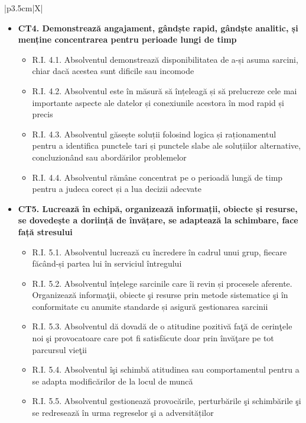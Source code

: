 \documentclass[11pt,a4paper]{article}
\begin{document}
\begin{xltabular}{\textwidth}{|p{3.5cm}|X|}
\begin{itemize}[leftmargin=*]
\begin{itemize}
        \end{itemize}
    \item \textbf{CT4. Demonstrează angajament, gândște rapid, gândște analitic, și menține concentrarea pentru perioade lungi de timp}
    \begin{itemize}
            \item R.I. 4.1. Absolventul demonstrează disponibilitatea de a-și asuma sarcini, chiar dacă acestea sunt dificile sau incomode
            \item R.I. 4.2. Absolventul este în măsură să înțeleagă și să prelucreze cele mai importante aspecte ale datelor și conexiunile acestora în mod rapid și precis
            \item R.I. 4.3. Absolventul găsește soluții folosind logica și raționamentul pentru a identifica punctele tari și punctele slabe ale soluțiilor alternative, concluzionând sau abordărilor problemelor
            \item R.I. 4.4. Absolventul rămâne concentrat pe o perioadă lungă de timp pentru a judeca corect și a lua decizii adecvate
        \end{itemize}
    \item \textbf{CT5. Lucrează în echipă, organizează informații, obiecte și resurse, se dovedește a doriință de învățare, se adaptează la schimbare, face față stresului}
    \begin{itemize}
            \item R.I. 5.1. Absolventul lucrează cu încredere în cadrul unui grup, fiecare făcând-și partea lui în serviciul întregului
            \item R.I. 5.2. Absolventul înțelege sarcinile care îi revin și procesele aferente. Organizează informaţii, obiecte şi resurse prin metode sistematice şi în conformitate cu anumite standarde și asigură gestionarea sarcinii
            \item R.I. 5.3. Absolventul dă dovadă de o atitudine pozitivă faţă de cerinţele noi şi provocatoare care pot fi satisfăcute doar prin învăţare pe tot parcursul vieţii
            \item R.I. 5.4. Absolventul îşi schimbă atitudinea sau comportamentul pentru a se adapta modificărilor de la locul de muncă
            \item R.I. 5.5. Absolventul gestionează provocările, perturbările şi schimbările şi se redresează în urma regreselor şi a adversităților
        \end{itemize}
\end{itemize}
\vspace{-0.3cm}
\\ \hline
\end{xltabular}
\end{document}
